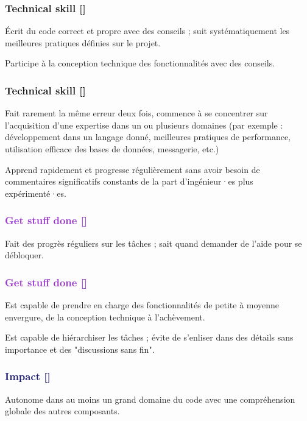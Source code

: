 \documentclass[a4paper, french, openany, 12pt]{book}
\newcommand\dex{\textcolor{BrickRed}{\textbf{Technical skill [\bsc{DEX}]}}}
\newcommand\str{\textcolor{DarkOrchid}{\textbf{Get stuff done [\bsc{STR}]}}}
\newcommand\wis{\textcolor{MidnightBlue}{\textbf{Impact [\bsc{WIS}]}}}
\begin{document}
\begin{multicols}{2}

  \subsubsection*{\dex}

  Écrit du code correct et propre avec des conseils ; suit systématiquement les meilleures pratiques définies sur le
  projet.

  Participe à la conception technique des fonctionnalités avec des conseils.

  \subsubsection*{\dex}

  Fait rarement la même erreur deux fois, commence à se concentrer sur l'acquisition d'une expertise dans un ou plusieurs 
  domaines (par exemple : développement dans un langage donné, meilleures pratiques de performance, utilisation efficace 
  des bases de données, messagerie, etc.)

  Apprend rapidement et progresse régulièrement sans avoir besoin de commentaires significatifs constants de la part 
  d'ingénieur·es plus expérimenté·es.

  \subsubsection*{\str}

  Fait des progrès réguliers sur les tâches ; sait quand demander de l'aide pour se débloquer.

  \subsubsection*{\str}

  Est capable de prendre en charge des fonctionnalités de petite à moyenne envergure, de la conception technique à 
  l'achèvement.

  Est capable de hiérarchiser les tâches ; évite de s'enliser dans des détails sans importance et des "discussions sans 
  fin".

  \subsubsection*{\wis}

  Autonome dans au moins un grand domaine du code avec une compréhension globale des autres composants.


\end{multicols}
\end{document}
